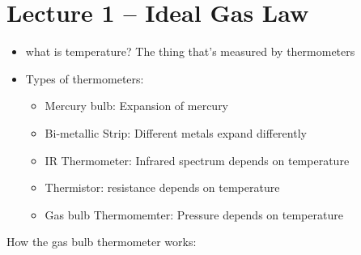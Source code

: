 \documentclass[10pt]{article}
\begin{document}
\section{Lecture 1 -- Ideal Gas Law}
\begin{itemize}
    \item what is temperature? The thing that's measured by thermometers
    \item Types of thermometers:
        \begin{itemize}
            \item Mercury bulb: Expansion of mercury
            \item Bi-metallic Strip: Different metals expand differently
            \item IR Thermometer: Infrared spectrum depends on temperature
            \item Thermistor: resistance depends on temperature
            \item Gas bulb Thermomemter: Pressure depends on temperature
        \end{itemize}
\end{itemize}
How the gas bulb thermometer works:
\end{document}
